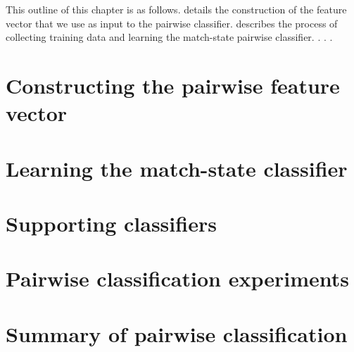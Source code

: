 This outline of this chapter is as follows.
 details the construction of the feature vector that we use
  as input to the pairwise classifier.
 describes the process of collecting training data and
  learning the match-state pairwise classifier.
 .
 .
 .


\section{Constructing the pairwise feature vector}
\section{Learning the match-state classifier}
\section{Supporting classifiers}
\section{Pairwise classification experiments}
\section{Summary of pairwise classification}

